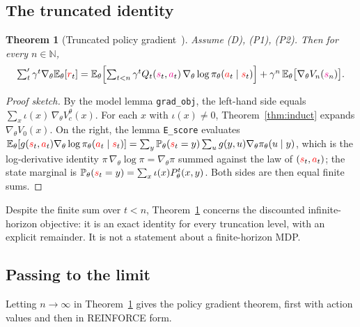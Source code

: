 \documentclass[11pt,a4paper]{article}
\newtheorem{theorem}{Theorem}[section]
\newcommand{\N}{\mathbb{N}}
\newcommand{\E}{\mathbb{E}}
\newcommand{\Prb}{\mathbb{P}}
\newcommand{\rv}[1]{{\color{red}#1}}       %
\newcommand{\ra}[1]{{\color{magenta}#1}}   %
\newcommand{\sv}{\rv{s}}
\newcommand{\av}{\rv{a}}
\newcommand{\rw}{\rv{r}}
\newcommand{\grad}{\nabla_{\theta}}
\newcommand{\tsum}{\textstyle\sum'}
\begin{document}
\subsection{The truncated identity}

\begin{theorem}[Truncated policy gradient~\cite{lemma_pgn}]
\label{thm:trunc}
Assume (D), (P1), (P2).
Then for every $n\in\N$,
\[
\tsum_t\gamma^t\grad\E_\theta[\rw_t]
=\E_\theta\Bigl[\sum_{t<n}\gamma^tQ_t(\ra{s}_t,\ra{a}_t)\,\grad\log\pi_\theta(\av_t\mid\sv_t)\Bigr]
+\gamma^n\,\E_\theta\bigl[\grad V_n(\ra{s}_n)\bigr].
\]
\end{theorem}
\begin{proof}[Proof sketch]
By the model lemma \texttt{grad\_obj}, the left-hand side equals $\sum_x\iota(x)\,\grad V_c^\theta(x)$.
For each $x$ with $\iota(x)\neq0$, Theorem~\ref{thm:induct} expands $\grad V_0(x)$.
On the right, the lemma \texttt{E\_score} evaluates
$\E_\theta[g(\sv_t,\av_t)\grad\log\pi_\theta(\av_t\mid\sv_t)]=\sum_y\Prb_\theta(\sv_t=y)\sum_ug(y,u)\grad\pi_\theta(u\mid y)$,
which is the log-derivative identity $\pi\,\grad\log\pi=\grad\pi$ summed against the law of $(\sv_t,\av_t)$; the state marginal is $\Prb_\theta(\sv_t=y)=\sum_x\iota(x)P^t_\theta(x,y)$.
Both sides are then equal finite sums.
\end{proof}

Despite the finite sum over $t<n$, Theorem~\ref{thm:trunc} concerns the discounted infinite-horizon objective: it is an exact identity for every truncation level, with an explicit remainder.
It is not a statement about a finite-horizon MDP.

\subsection{Passing to the limit}
\label{sec:passlimit}

Letting $n\to\infty$ in Theorem~\ref{thm:trunc} gives the policy gradient theorem, first with action values and then in REINFORCE form.
\end{document}
